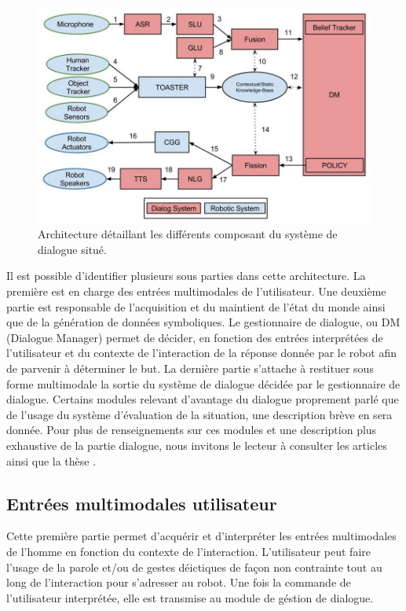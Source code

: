 \documentclass[a4paper,11pt,twoside]{StyleThese}
\begin{document}
\begin{figure}[ht!]
 \centering
  \includegraphics[width=0.99\linewidth]{./img/archiphase1.jpg} 
  \caption {Architecture détaillant les différents composant du système de dialogue situé.}
  \label{fig:archiphase1}
\end{figure}

Il est possible d'identifier plusieurs sous parties dans cette architecture.
La première est en charge des entrées multimodales de l'utilisateur. Une deuxième partie est responsable de l'acquisition et du maintient de l'état du monde ainsi que de la génération de données symboliques. Le gestionnaire de dialogue, ou DM (Dialogue Manager) permet de décider, en fonction des entrées interprétées de l'utilisateur et du contexte de l'interaction de la réponse donnée par le robot afin de parvenir à déterminer le but.
La dernière partie s'attache à restituer sous forme multimodale la sortie du système de dialogue décidée par le gestionnaire de dialogue.
Certains modules relevant d'avantage du dialogue proprement parlé que de l'usage du système d'évaluation de la situation, une description brève en sera donnée. Pour plus de renseignements sur ces modules et une description plus exhaustive de la partie dialogue, nous invitons le lecteur à consulter les articles \cite{Ferreira13a,Ferreira13b} ainsi que la thèse \cite{ferreira2015phd}.

\subsection{Entrées multimodales utilisateur}
\label{sec:entréesDial}
Cette première partie permet d'acquérir et d'interpréter les entrées multimodales de l'homme en fonction du contexte de l'interaction. L’utilisateur peut faire l’usage de la parole et/ou de gestes déictiques de façon non contrainte tout au long de l’interaction pour s’adresser au robot. Une fois la commande de l'utilisateur interprétée, elle est transmise au module de géstion de dialogue. 
\end{document}
